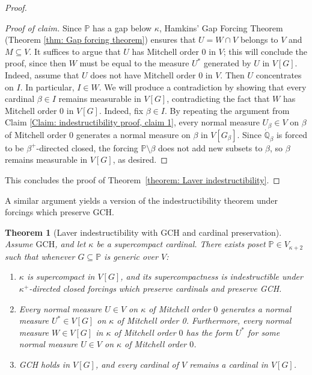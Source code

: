 \documentclass[11pt]{amsart}
\newtheorem{theorem}{Theorem}[section]
\theoremstyle{definition}
\theoremstyle{remark}
\newcommand\<{{<}}
\newcommand{\po}{\mathbb{P}}
\newcommand{\qo}{\mathbb{Q}}
\begin{document}
\begin{proof}
\begin{proof}[Proof of claim]
    Since $\po$ has a gap below $\kappa$,  Hamkins' Gap Forcing Theorem (Theorem \ref{thm: Gap forcing theorem}) ensures that  $U = W\cap V$ belongs to $V$ and $M\subseteq V$. It suffices to argue that $U$ has Mitchell order $0$ in $V$; this will conclude the proof, since then $W$ must be equal to the measure $U^*$ generated by $U$ in $V[G]$. Indeed, assume that $U$ does not have Mitchell order $0$ in $V$. {Then $U$ concentrates on $I$.} 
    In particular, $I\in W$. We will produce a contradiction by showing that every cardinal $\beta\in I$ remains measurable in $V[G]$, contradicting the fact that $W$ has Mitchell order $0$ in $V[G]$. Indeed, fix $\beta\in I$. By repeating the argument from Claim \ref{Claim: indestructibility proof, claim 1}, every normal measure $U_\beta\in V$ on $\beta$ of Mitchell order $0$ generates a normal measure on $\beta$ in $V[G_{\beta}]$. Since $\dot{\qo}_\beta$ is forced to be $\beta^+$-directed closed, the forcing $\po\setminus \beta$ does not add new subsets to $\beta$, so $\beta$ remains measurable in $V[G]$, as desired. 
\end{proof}
   This concludes the proof of Theorem~\ref{theorem: Laver indestructibility}.
    \end{proof}


A similar argument yields a version of the indestructibility theorem under forcings which preserve GCH.

\begin{theorem}[Laver indestructibility with GCH and cardinal preservation]\label{theorem: Laver indestructibility+GCH}
        Assume $\mathrm{GCH}$, and let $\kappa$ be a supercompact cardinal. There exists poset $\po\in V_{\kappa+2}$ such that whenever $G\subseteq \po$ is generic over $V$:
        \begin{enumerate}
            \item $\kappa$ is supercompact in $V[G]$, and its supercompactness is indestructible under $\kappa^+$-directed closed forcings which preserve cardinals and preserve  \rm{GCH}.
            \item Every normal measure $U\in V$ on $\kappa$ of Mitchell order $0$ generates a normal measure $U^*\in V[G]$ on $\kappa$ of Mitchell order 0. Furthermore, every normal measure $W\in V[G]$ in $\kappa$ of Mitchell order $0$ has the form $U^*$ for some normal measure $U\in V$ on $\kappa$ of Mitchell order $0$.
            \item \rm{GCH} holds in $V[G]$, and every cardinal of $V$ remains a cardinal in $V[G]$.
        \end{enumerate}
    \end{theorem}
\end{document}
